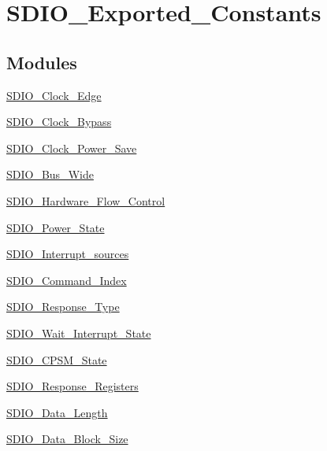 \hypertarget{group___s_d_i_o___exported___constants}{}\section{S\+D\+I\+O\+\_\+\+Exported\+\_\+\+Constants}
\label{group___s_d_i_o___exported___constants}
\subsection*{Modules}
\begin{DoxyCompactItemize}
\item 
\mbox{\hyperlink{group___s_d_i_o___clock___edge}{S\+D\+I\+O\+\_\+\+Clock\+\_\+\+Edge}}
\item 
\mbox{\hyperlink{group___s_d_i_o___clock___bypass}{S\+D\+I\+O\+\_\+\+Clock\+\_\+\+Bypass}}
\item 
\mbox{\hyperlink{group___s_d_i_o___clock___power___save}{S\+D\+I\+O\+\_\+\+Clock\+\_\+\+Power\+\_\+\+Save}}
\item 
\mbox{\hyperlink{group___s_d_i_o___bus___wide}{S\+D\+I\+O\+\_\+\+Bus\+\_\+\+Wide}}
\item 
\mbox{\hyperlink{group___s_d_i_o___hardware___flow___control}{S\+D\+I\+O\+\_\+\+Hardware\+\_\+\+Flow\+\_\+\+Control}}
\item 
\mbox{\hyperlink{group___s_d_i_o___power___state}{S\+D\+I\+O\+\_\+\+Power\+\_\+\+State}}
\item 
\mbox{\hyperlink{group___s_d_i_o___interrupt__sources}{S\+D\+I\+O\+\_\+\+Interrupt\+\_\+sources}}
\item 
\mbox{\hyperlink{group___s_d_i_o___command___index}{S\+D\+I\+O\+\_\+\+Command\+\_\+\+Index}}
\item 
\mbox{\hyperlink{group___s_d_i_o___response___type}{S\+D\+I\+O\+\_\+\+Response\+\_\+\+Type}}
\item 
\mbox{\hyperlink{group___s_d_i_o___wait___interrupt___state}{S\+D\+I\+O\+\_\+\+Wait\+\_\+\+Interrupt\+\_\+\+State}}
\item 
\mbox{\hyperlink{group___s_d_i_o___c_p_s_m___state}{S\+D\+I\+O\+\_\+\+C\+P\+S\+M\+\_\+\+State}}
\item 
\mbox{\hyperlink{group___s_d_i_o___response___registers}{S\+D\+I\+O\+\_\+\+Response\+\_\+\+Registers}}
\item 
\mbox{\hyperlink{group___s_d_i_o___data___length}{S\+D\+I\+O\+\_\+\+Data\+\_\+\+Length}}
\item 
\mbox{\hyperlink{group___s_d_i_o___data___block___size}{S\+D\+I\+O\+\_\+\+Data\+\_\+\+Block\+\_\+\+Size}}

\end{DoxyCompactItemize}
